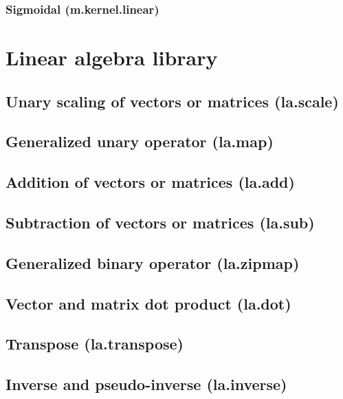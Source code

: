 \documentclass{article}
\theoremstyle{definition}
\begin{document}
\subsubsection{Sigmoidal (m.kernel.linear)}

\pagebreak

\section{Linear algebra library}

\subsection{Unary scaling of vectors or matrices (la.scale)}

\subsection{Generalized unary operator (la.map)}

\subsection{Addition of vectors or matrices (la.add)}

\subsection{Subtraction of vectors or matrices (la.sub)}

\subsection{Generalized binary operator (la.zipmap)}

\subsection{Vector and matrix dot product (la.dot)}

\subsection{Transpose (la.transpose)}

\subsection{Inverse and pseudo-inverse (la.inverse)}
\end{document}
